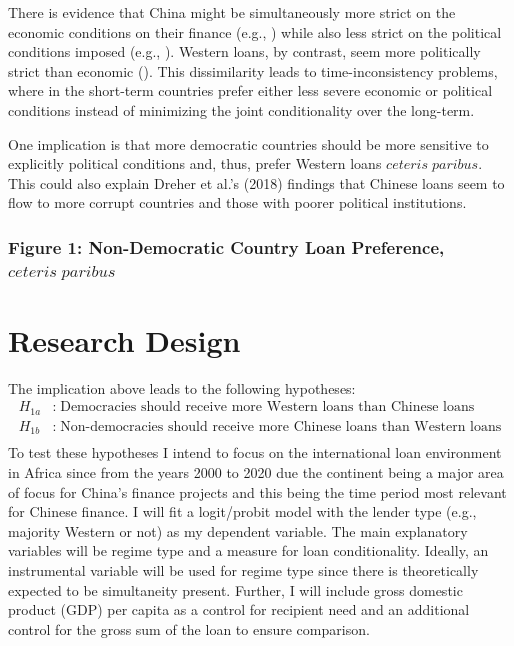 \documentclass[12pt]{article}
\begin{document}
There is evidence that China might be simultaneously more strict on the economic conditions on their finance (e.g., \cite{dreher2018}) while also less strict on the political conditions imposed (e.g., \cite{dreher2018}). Western loans, by contrast, seem more politically strict than economic (\cite{hernandez2017}). This dissimilarity leads to time-inconsistency problems, where in the short-term countries prefer either less severe economic or political conditions instead of minimizing the joint conditionality over the long-term.

One implication is that more democratic countries should be more sensitive to explicitly political conditions and, thus, prefer Western loans $ceteris\;paribus$. This could also explain Dreher et al.'s (2018) findings that Chinese loans seem to flow to more corrupt countries and those with poorer political institutions.

\subsubsection*{Figure 1: Non-Democratic Country Loan Preference, $ceteris\;paribus$}

\section*{Research Design}
The implication above leads to the following hypotheses:
\begin{align*}
    H_{1a}&:\;\text{Democracies should receive more Western loans than Chinese loans}\\
    H_{1b}&:\;\text{Non-democracies should receive more Chinese loans than Western loans}\\
\end{align*}
To test these hypotheses I intend to focus on the international loan environment in Africa since from the years 2000 to 2020 due the continent being a major area of focus for China's finance projects and this being the time period most relevant for Chinese finance. I will fit a logit/probit model with the lender type (e.g., majority Western or not) as my dependent variable. The main explanatory variables will be regime type and a measure for loan conditionality. Ideally, an instrumental variable will be used for regime type since there is theoretically expected to be simultaneity present. Further, I will include gross domestic product (GDP) per capita as a control for recipient need and an additional control for the gross sum of the loan to ensure comparison.
\end{document}
